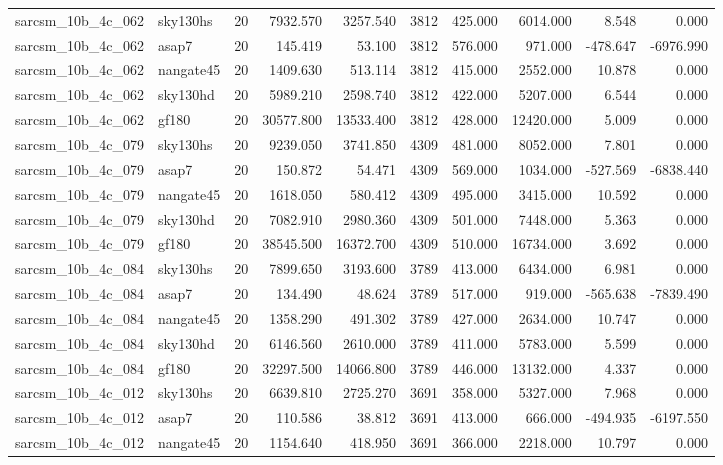 \begin{longtable}{llrrrrrrrr}
sarcsm\_10b\_4c\_062 & sky130hs & 20 & 7932.570 & 3257.540 & 3812 & 425.000 & 6014.000 & 8.548 & 0.000 \\
sarcsm\_10b\_4c\_062 & asap7 & 20 & 145.419 & 53.100 & 3812 & 576.000 & 971.000 & -478.647 & -6976.990 \\
sarcsm\_10b\_4c\_062 & nangate45 & 20 & 1409.630 & 513.114 & 3812 & 415.000 & 2552.000 & 10.878 & 0.000 \\
sarcsm\_10b\_4c\_062 & sky130hd & 20 & 5989.210 & 2598.740 & 3812 & 422.000 & 5207.000 & 6.544 & 0.000 \\
sarcsm\_10b\_4c\_062 & gf180 & 20 & 30577.800 & 13533.400 & 3812 & 428.000 & 12420.000 & 5.009 & 0.000 \\
sarcsm\_10b\_4c\_079 & sky130hs & 20 & 9239.050 & 3741.850 & 4309 & 481.000 & 8052.000 & 7.801 & 0.000 \\
sarcsm\_10b\_4c\_079 & asap7 & 20 & 150.872 & 54.471 & 4309 & 569.000 & 1034.000 & -527.569 & -6838.440 \\
sarcsm\_10b\_4c\_079 & nangate45 & 20 & 1618.050 & 580.412 & 4309 & 495.000 & 3415.000 & 10.592 & 0.000 \\
sarcsm\_10b\_4c\_079 & sky130hd & 20 & 7082.910 & 2980.360 & 4309 & 501.000 & 7448.000 & 5.363 & 0.000 \\
sarcsm\_10b\_4c\_079 & gf180 & 20 & 38545.500 & 16372.700 & 4309 & 510.000 & 16734.000 & 3.692 & 0.000 \\
sarcsm\_10b\_4c\_084 & sky130hs & 20 & 7899.650 & 3193.600 & 3789 & 413.000 & 6434.000 & 6.981 & 0.000 \\
sarcsm\_10b\_4c\_084 & asap7 & 20 & 134.490 & 48.624 & 3789 & 517.000 & 919.000 & -565.638 & -7839.490 \\
sarcsm\_10b\_4c\_084 & nangate45 & 20 & 1358.290 & 491.302 & 3789 & 427.000 & 2634.000 & 10.747 & 0.000 \\
sarcsm\_10b\_4c\_084 & sky130hd & 20 & 6146.560 & 2610.000 & 3789 & 411.000 & 5783.000 & 5.599 & 0.000 \\
sarcsm\_10b\_4c\_084 & gf180 & 20 & 32297.500 & 14066.800 & 3789 & 446.000 & 13132.000 & 4.337 & 0.000 \\
sarcsm\_10b\_4c\_012 & sky130hs & 20 & 6639.810 & 2725.270 & 3691 & 358.000 & 5327.000 & 7.968 & 0.000 \\
sarcsm\_10b\_4c\_012 & asap7 & 20 & 110.586 & 38.812 & 3691 & 413.000 & 666.000 & -494.935 & -6197.550 \\
sarcsm\_10b\_4c\_012 & nangate45 & 20 & 1154.640 & 418.950 & 3691 & 366.000 & 2218.000 & 10.797 & 0.000 \\

\end{longtable}
